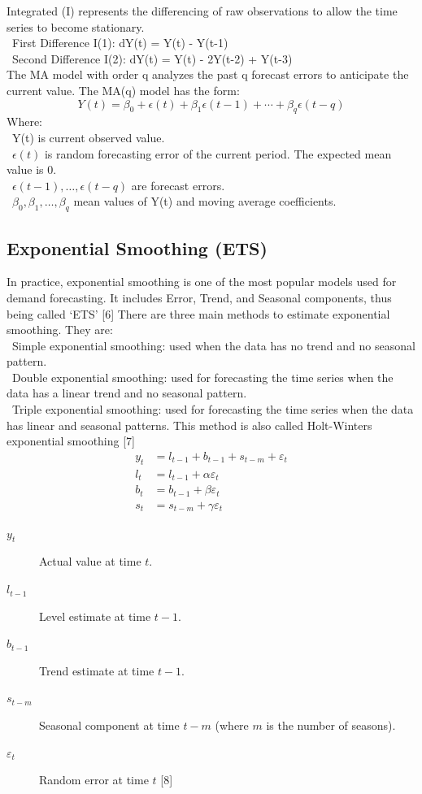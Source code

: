 \documentclass{ieeeojies}
\begin{document}
 Integrated (I) represents the differencing of raw observations to allow the time series to become stationary.\\
    \indent\textbullet\ First Difference I(1): dY(t) = Y(t) - Y(t-1)\\
    \indent\textbullet\ Second Difference I(2): dY(t) = Y(t) - 2Y(t-2) + Y(t-3)\\
 
The MA model with order q analyzes the past q forecast errors to anticipate the current value. The MA(q) model has the form:
  \[Y(t)=\beta_0+\epsilon(t)+\beta_1\epsilon(t-1)+\cdots+\beta_q\epsilon(t-q)\]
        Where:\\
	    \indent\textbullet\ Y(t) is current observed value.\\
            \indent\textbullet\ \(\epsilon(t)\) is random forecasting error of the current period. The expected mean value is 0.\\
            \indent\textbullet\ \(\epsilon(t-1), \ldots, \epsilon(t-q)\) are forecast errors.\\
            \indent\textbullet\ \(\beta_0, \beta_1, \ldots, \beta_q\) mean values of Y(t) and moving average coefficients.\\
\subsection{Exponential Smoothing (ETS)}
In practice, exponential smoothing is one of the most popular models used for demand forecasting. It includes Error, Trend, and Seasonal components, thus being called ‘ETS’ [6] 
There are three main methods to estimate exponential smoothing. They are: \\
    \indent\textbullet\ Simple exponential smoothing: used when the data has no trend and no seasonal pattern. \\
    \indent\textbullet\ Double exponential smoothing: used for forecasting the time series when the data has a linear trend and no seasonal pattern. \\
    \indent\textbullet\ Triple exponential smoothing: used for forecasting the time series when the data has linear and seasonal patterns. This method is also called Holt-Winters exponential smoothing [7]
        \begin{align*}
        y_t &= l_{t-1} + b_{t-1} + s_{t-m} + \varepsilon_t \\
        l_t &= l_{t-1} + \alpha \varepsilon_t \\
        b_t &= b_{t-1} + \beta \varepsilon_t \\
        s_t &= s_{t-m} + \gamma \varepsilon_t
        \end{align*}
    \begin{description}
  \item[$y_t$] Actual value at time $t$.
  \item[$l_{t-1}$] Level estimate at time $t-1$.
  \item[$b_{t-1}$] Trend estimate at time $t-1$.
  \item[$s_{t-m}$] Seasonal component at time $t-m$ (where $m$ is the number of seasons).
  \item[$\varepsilon_t$] Random error at time $t$ [8]
\end{description}
\end{document}
